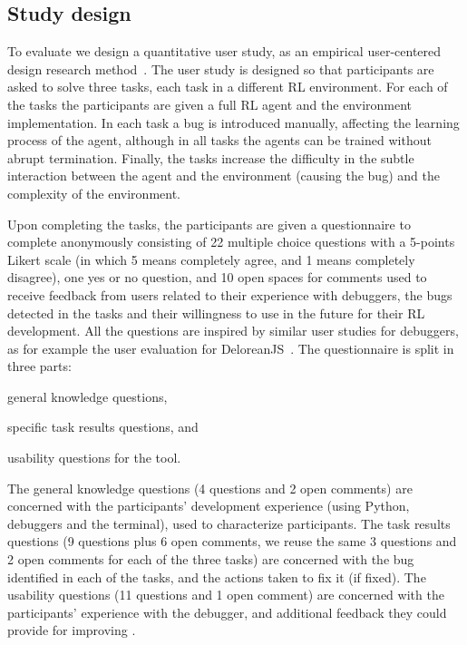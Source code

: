 \subsection{Study design}
\label{sec:design}

To evaluate \flik we design a quantitative user study, as an empirical user-centered design research 
method~\cite{creswell17}.
The user study is designed so that participants are asked to solve three tasks, each task in a different 
\ac{RL} environment. For each of the tasks the participants are given a full \ac{RL} agent and the 
environment implementation. In each task a bug is introduced manually, affecting the learning 
process of the agent, although in all tasks the agents can be trained without abrupt termination. 
Finally, the tasks increase the difficulty in the subtle interaction between the agent and the 
environment (causing the bug) and the complexity of the environment.

Upon completing the tasks, the participants are given a questionnaire to complete anonymously 
consisting of 22 multiple choice 
questions with a 5-points Likert scale (in which 5 means completely agree, and 1 means completely 
disagree), one yes or no question, and 10 open spaces for comments used to receive feedback 
from users related to their experience with debuggers, the bugs detected in the tasks and their 
willingness to use \flik in the future for their \ac{RL} development. All the questions are inspired 
by similar user studies for debuggers, as for example the user evaluation for 
DeloreanJS~\cite{leger23}. 
The questionnaire is split in three parts:
\begin{enumerate*}[label=(\arabic*)]
\item general knowledge questions, 
\item specific task results questions, and 
\item usability questions for the tool. 
\end{enumerate*}

The general knowledge questions (4 questions and 2 open comments) are concerned with the 
participants' development experience (\ie using Python, debuggers and the terminal), used to 
characterize participants. The task results questions (9 questions plus 6 open comments, we reuse 
the same 3 questions and 2 open comments for each of the three tasks) are 
concerned with the bug identified in each of the tasks, and the actions taken to fix it (if fixed). The 
usability questions (11 questions and 1 open comment) are concerned with the participants' 
experience with the debugger, and additional feedback they could provide for improving \flik. 

